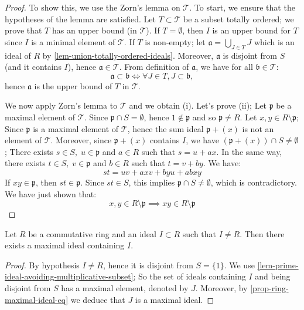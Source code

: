 \documentclass[12pt]{report}
\begin{document}
\begin{proof}
    To show this, we use the Zorn's lemma on $\mathcal{T}$. To start, we ensure that the hypotheses of the lemma are satisfied. Let $T \subset \mathcal{T}$ be a subset totally ordered; we prove that $T$ has an upper bound (in $\mathcal{T}$). If $T = \emptyset$, then $I$ is an upper bound for $T$ since $I$ is a minimal element of $\mathcal{T}$. If $T$ is non-empty; let $\mathfrak{a} = \bigcup_{J \in T} J$ which is an ideal of $R$ by \ref{lem-union-totally-ordered-ideals}. Moreover, $\mathfrak{a}$ is disjoint from $S$ (and it contains $I$), hence $\mathfrak{a} \in \mathcal{T}$. From definition of $\mathfrak{a}$, we have for all $\mathfrak{b} \in \mathcal{T}$:
    \[
        \mathfrak{a} \subset \mathfrak{b} \iff \forall J \in T, J \subset \mathfrak{b},
    \]
    hence $\mathfrak{a}$ is the upper bound of $T$ in $\mathcal{T}$.

    We now apply Zorn's lemma to $\mathcal{T}$ and we obtain (i). Let's prove (ii); Let $\mathfrak{p}$ be a maximal element of $\mathcal{T}$. Since $\mathfrak{p} \cap S = \emptyset$, hence $1 \not \in \mathfrak{p}$ and so $\mathfrak{p} \neq R$. Let $x, y \in R \setminus \mathfrak{p}$; Since $\mathfrak{p}$ is a maximal element of $\mathcal{T}$, hence the sum ideal $\mathfrak{p} + (x)$ is not an element of $\mathcal{T}$. Moreover, since $\mathfrak{p} + (x)$ contains $I$, we have $(\mathfrak{p} + (x)) \cap S \neq \emptyset$; There exists $s \in S, \; u \in \mathfrak{p}$ and $a \in R$ such that $s = u + a x$. In the same way, there exists $t \in S, \; v \in \mathfrak{p}$ and $b \in R$ such that $t = v + b y$. We have:
    \[
        s t = u v + a x v + b y u + a b x y
    \]
    If $x y \in \mathfrak{p}$, then $s t \in \mathfrak{p}$. Since $s t \in S$, this implies $\mathfrak{p} \cap S \neq \emptyset$, which is contradictory. We have just shown that:
    \[
        x, y \in R \setminus \mathfrak{p} \implies x y \in R \setminus \mathfrak{p}
    \]
\end{proof}

\begin{proposition} \label{prop-ideal-included-in-maximal-ideal}
    Let $R$ be a commutative ring and an ideal $I \subset R$ such that $I \neq R$. Then there exists a maximal ideal containing $I$.
\end{proposition}

\begin{proof}
    By hypothesis $I \neq R$, hence it is disjoint from $S = \lbrace 1 \rbrace$. We use \ref{lem-prime-ideal-avoiding-multiplicative-subset}; So the set of ideals containing $I$ and being disjoint from $S$ has a maximal element, denoted by $J$. Moreover, by \ref{prop-ring-maximal-ideal-eq} we deduce that $J$ is a maximal ideal.
\end{proof}
\end{document}

